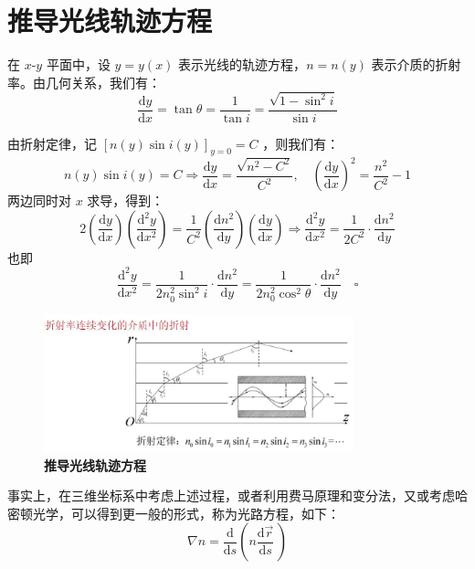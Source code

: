 \documentclass[UTF8]{report}
\theoremstyle{MyLineTheoremStyle} %
\theoremstyle{MyBlockTheoremStyle} %
\theoremstyle{MySubsubsectionStyle} %
\begin{document}
\section{推导光线轨迹方程}

在 $x$-$y$ 平面中，设 $y = y(x)$ 表示光线的轨迹方程，$n = n(y)$ 表示介质的折射率。由几何关系，我们有：
\begin{equation}
\frac{\mathrm{d} y }{\mathrm{d} x } = \tan \theta = \frac{1}{\tan i} = \frac{\sqrt{1-\sin^2 i}}{\sin i} 
\end{equation}

由折射定律，记 $[n(y)\sin i(y)]_{y=0} = C$ ，则我们有：
\begin{equation}
n(y)\sin i(y) = C \Longrightarrow \frac{\mathrm{d} y }{\mathrm{d} x } = \frac{\sqrt{n^2 - C^2}}{C^2}, \quad \left(\frac{\mathrm{d} y }{\mathrm{d} x }\right)^{2} = \frac{n^2}{C^2} - 1
\end{equation}
两边同时对 $x$ 求导，得到：
\begin{equation}
2 \left(\frac{\mathrm{d} y }{\mathrm{d} x }\right) \left(\frac{\mathrm{d}^2 y }{\mathrm{d} x^2 }\right) = \frac{1}{C^2} \left(\frac{\mathrm{d} n^2 }{\mathrm{d} y }\right) \left(\frac{\mathrm{d} y }{\mathrm{d} x }\right) \Longrightarrow \frac{\mathrm{d}^2 y }{\mathrm{d} x^2 } = \frac{1}{2C^2}\cdot \frac{\mathrm{d} n^2 }{\mathrm{d} y } 
\end{equation}
也即
\begin{equation}
    \frac{\mathrm{d}^2 y }{\mathrm{d} x^2 } = \frac{1}{2n_0^2\sin^2 i}\cdot \frac{\mathrm{d} n^2 }{\mathrm{d} y } = \frac{1}{2n_0^2\cos^2 \theta}\cdot \frac{\mathrm{d} n^2 }{\mathrm{d} y } \quad \square
\end{equation}

\begin{figure}[H]\centering
\includegraphics[width=0.8\textwidth]{assets/1/88b3f41951f9d3be9e2964935ebaf0f7.jpg}
\caption{\textbf{推导光线轨迹方程}}\label{推导光线轨迹方程}
\end{figure}

事实上，在三维坐标系中考虑上述过程，或者利用费马原理和变分法，又或考虑哈密顿光学，可以得到更一般的形式，称为光路方程，如下：
\begin{equation}
    \nabla n=\frac{\mathrm{d}}{\mathrm{d}s}\left(n\frac{\mathrm{d}\vec{r}}{\mathrm{d}s}\,\right)
\end{equation}
\end{document}

